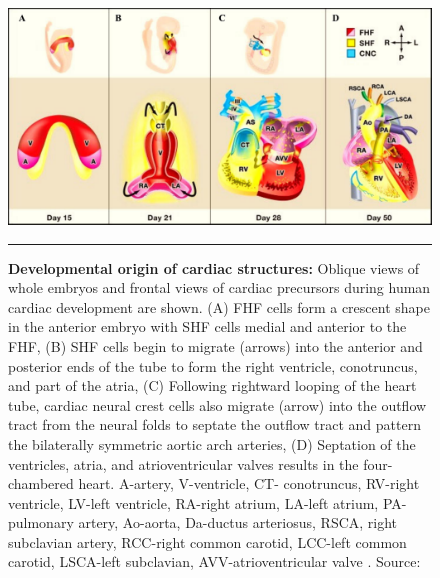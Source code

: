 \begin{refsection}
\begin{figure}[!tb]
\centering
\includegraphics[scale=0.5,keepaspectratio]{Figures/Figure1_1.pdf}
\rule{35em}{0.5pt}
\caption{\textbf{Developmental origin of cardiac structures:} Oblique views of whole embryos and frontal views of cardiac precursors during human cardiac development are shown. (A) FHF cells form a crescent shape in the anterior embryo with SHF cells medial and anterior to the FHF, (B) SHF cells begin to migrate (arrows) into the anterior and posterior ends of the tube to form the right ventricle, conotruncus, and part of the atria, (C) Following rightward looping of the heart tube, cardiac neural crest cells also migrate (arrow) into the outflow tract from the neural folds to septate the outflow tract and pattern the bilaterally symmetric aortic arch arteries, (D) Septation of the ventricles, atria, and atrioventricular valves results in the four-chambered heart.
A-artery, V-ventricle, CT- conotruncus, RV-right ventricle, LV-left ventricle, RA-right atrium, LA-left atrium, PA-pulmonary artery, Ao-aorta, Da-ductus arteriosus, RSCA, right subclavian artery, RCC-right common carotid, LCC-left common carotid, LSCA-left subclavian, AVV-atrioventricular valve . Source: \cite{srivastava2006genetic}}
\label{fig:1_1}
\end{figure}


\end{refsection}
